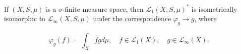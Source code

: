 If $(X, S, \mu)$ is a $\sigma$-finite measure space, then $\mathcal{L}_1(X, S, \mu)^*$ is isometrically isomorphic to $\mathcal{L}_\infty(X, S, \mu)$ under the correspondence $\varphi_g \rightarrow g$, where

$$\varphi_g(f) = \int_X f g d\mu, \quad f \in \mathcal{L}_1(X), \quad g \in \mathcal{L}_\infty(X).$$
